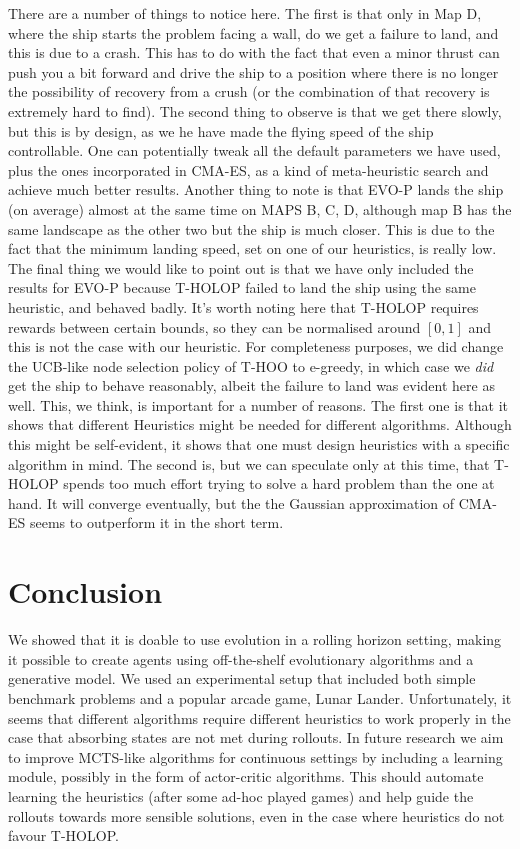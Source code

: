\documentclass[conference]{IEEEtran}
\begin{document}
There are a number of things to notice here. The first is that only in Map D, where the ship starts the problem facing a wall, do we get a failure to land, and this is due to a crash. This has to do with the fact that even a minor thrust can push you a bit forward and drive the ship to a position where there is no longer the possibility of recovery from a crush (or the combination of that recovery is extremely hard to find). The second thing to observe is that we get there slowly, but this is by design, as we he have made the flying speed of the ship controllable. One can potentially tweak all the default parameters we have used, plus the ones incorporated in CMA-ES, as a kind of meta-heuristic search and achieve much better results. Another thing to note is that EVO-P lands the ship (on average) almost at the same time on MAPS B, C, D, although map B has the same landscape as the other two but the ship is much closer. This is due to the fact that the minimum landing speed, set on one of our heuristics, is really low. The final thing we would like to point out is that we have only included the results for EVO-P because T-HOLOP failed to land the ship using the same heuristic, and behaved badly. It's worth noting here that T-HOLOP requires rewards between certain bounds, so they can be normalised around $[0,1]$ and this is not the case with our heuristic. For completeness purposes, we did change the UCB-like node selection policy of T-HOO to e-greedy, in which case we \emph{did} get the ship to behave reasonably, albeit the failure to land was evident here as well. This, we think, is important for a number of reasons. The first one is that it shows that different Heuristics might be needed for different algorithms. Although this might be self-evident, it shows that one must design heuristics with a specific algorithm in mind. The second is, but we can speculate only at this time, that T-HOLOP spends too much effort trying to solve a hard problem than the one at hand. It will converge eventually, but the the Gaussian approximation of CMA-ES seems to outperform it in the short term. 


\section{Conclusion} \label{sec:conclusion}
We showed that it is doable to use evolution in a rolling horizon setting, making it possible to create agents using off-the-shelf evolutionary algorithms and a generative model. We used an experimental setup that included both simple benchmark problems and a popular arcade game, Lunar Lander. Unfortunately, it seems that different algorithms require different heuristics to work properly in the case that absorbing states are not met during rollouts. In future research we aim to improve MCTS-like algorithms for continuous settings by including a learning module, possibly in the form of actor-critic algorithms. This should automate learning the heuristics (after some ad-hoc played games) and help guide the rollouts towards more sensible solutions, even in the case where heuristics do not favour T-HOLOP. 
\end{document}

